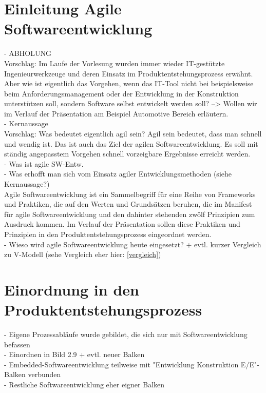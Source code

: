 \section{Einleitung Agile Softwareentwicklung}
- ABHOLUNG\\
Vorschlag: Im Laufe der Vorlesung wurden immer wieder IT-gestützte Ingenieurwerkzeuge und deren Einsatz im Produktentstehungsprozess erwähnt. \cite{Daberkow2022} Aber wie ist eigentlich das Vorgehen, wenn das IT-Tool nicht bei beispielsweise beim Anforderungsmanagement oder der Entwicklung in der Konstruktion unterstützen soll, sondern Software selbst entwickelt werden soll? --> Wollen wir im Verlauf der Präsentation am Beispiel Automotive Bereich erläutern. \\
- Kernaussage\\
Vorschlag: Was bedeutet eigentlich agil sein? Agil sein bedeutet, dass man schnell und wendig ist. Das ist auch das Ziel der agilen Softwareentwicklung. Es soll mit ständig angepasstem Vorgehen schnell vorzeigbare Ergebnisse erreicht werden. \cite{wolf2011agile}\\
- Was ist agile SW-Entw.\\
- Was erhofft man sich vom Einsatz agiler Entwicklungsmethoden (siehe Kernaussage?)\\
\glqq Agile Softwareentwicklung ist ein Sammelbegriff für eine Reihe von Frameworks und Praktiken, die auf den Werten und Grundsätzen beruhen, die im Manifest für agile Softwareentwicklung und den dahinter stehenden zwölf Prinzipien zum Ausdruck kommen.\grqq  \cite{agile101} Im Verlauf der Präsentation sollen diese Praktiken und Prinzipien in den Produktentstehungsprozess eingeordnet werden. \\
- Wieso wird agile Softwareentwicklung heute eingesetzt? + evtl. kurzer Vergleich zu V-Modell (sehe Vergleich eher hier: \ref{vergleich})\\ 

\section{Einordnung in den Produktentstehungsprozess}
- Eigene Prozessabläufe wurde gebildet, die sich nur mit Softwareentwicklung befassen\\
- Einordnen in Bild 2.9 + evtl. neuer Balken\\
- Embedded-Softwareentwicklung teilweise mit "Entwicklung Konstruktion E/E"-Balken verbunden\\
- Restliche Softwareentwicklung eher eigner Balken\\
